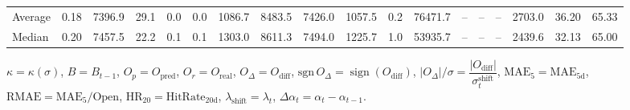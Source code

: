 \begin{threeparttable}
{\begin{tabular}{lrrrrrrrrrrrrrrrrr}
Average &     0.18 & 7396.9 &              29.1 &               0.0 &                0.0 &             1086.7 &  8483.5 & 7426.0 &     1057.5 &                      0.2 &             76471.7 &         -- &        -- &             -- &           2703.0 &           36.20 &                  65.33 \\
 Median &     0.20 & 7457.5 &              22.2 &               0.1 &                0.1 &             1303.0 &  8611.3 & 7494.0 &     1225.7 &                      1.0 &             53935.7 &         -- &        -- &             -- &           2439.6 &           32.13 &                  65.00 \\
\bottomrule
\end{tabular}
}
\begin{tablenotes}\footnotesize
\item $\kappa=\kappa(\sigma)$, $B=B_{t-1}$, $O_p=O_{\text{pred}}$, $O_r=O_{\text{real}}$, $O_\Delta=O_{\text{diff}}$, $\mathrm{sgn}\,O_\Delta=\operatorname{sign}(O_{\text{diff}})$, $|O_\Delta|/\sigma=\dfrac{|O_{\text{diff}}|}{\sigma_t^{\text{shift}}}$, $\mathrm{MAE}_5=\mathrm{MAE}_{5\text{d}}$, $\mathrm{RMAE}= \mathrm{MAE}_5 / \text{Open}$, $\mathrm{HR}_{20}=\mathrm{HitRate}_{20\text{d}}$, 
$\lambda_{\text{shift}}=\lambda_t$, 
$\Delta\alpha_t=\alpha_t-\alpha_{t-1}$.
\end{tablenotes}
\end{threeparttable}
\endgroup

